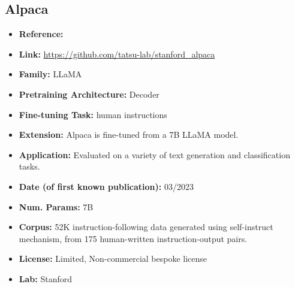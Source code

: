 \documentclass{article}
\begin{document}
\subsection{Alpaca}
            \begin{itemize}
            \item \textbf{Reference:}~
            \item \textbf{Link:} \url{https://github.com/tatsu-lab/stanford_alpaca}
            \item \textbf{Family:} LLaMA
            \item \textbf{Pretraining Architecture:} Decoder
            \item \textbf{Fine-tuning Task:} human instructions 
            \item \textbf{Extension:} Alpaca is fine-tuned from a 7B LLaMA model.
            \item \textbf{Application:} Evaluated on a variety of text generation and classification tasks.
            \item \textbf{Date (of first known publication):} 03/2023
            \item \textbf{Num. Params:} 7B
            \item \textbf{Corpus:} 52K instruction-following data generated using self-instruct mechanism, from 175 human-written instruction-output pairs. 
            \item \textbf{License:} Limited, Non-commercial bespoke license
            \item \textbf{Lab:} Stanford
            \end{itemize}
            
\end{document}
